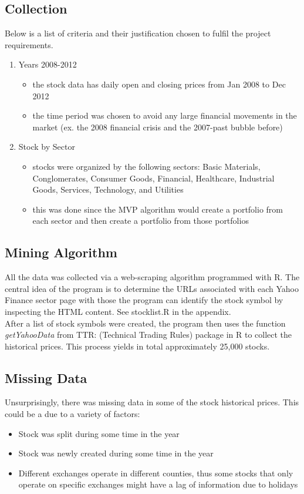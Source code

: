 \documentclass[12pt]{article}
\begin{document}
\subsection{Collection}
Below is a list of criteria and their justification chosen to fulfil the project requirements. 
\begin{enumerate}
\item Years 2008-2012
\begin{itemize}
\item the stock data has daily open and closing prices from Jan 2008 to Dec 2012
\item the time period was chosen to avoid any large financial movements in the market (ex. the 2008 financial crisis and the 2007-past bubble before)
\end{itemize}
\item Stock by Sector
\begin{itemize}
\item stocks were organized by the following sectors: Basic Materials, Conglomerates, Consumer Goods, Financial, Healthcare, Industrial Goods, Services, Technology, and Utilities
\item this was done since the MVP algorithm would create a portfolio from each sector and then create a portfolio from those portfolios
\end{itemize}
\end{enumerate}

\subsection{Mining Algorithm}
All the data was collected via a web-scraping algorithm programmed with R. The central idea of the program is to determine the URLs associated with each Yahoo Finance sector page with those the program can identify the stock symbol by inspecting the HTML content. See stocklist.R in the appendix.\\

After a list of stock symbols were created, the program then uses the function \textit{getYahooData} from TTR: (Technical Trading Rules) package in R to collect the historical prices. This process yields in total approximately 25,000 stocks. 
\subsection{Missing Data}
Unsurprisingly, there was missing data in some of the stock historical prices. This could be a due to a variety of factors: 
\begin{itemize}
\item Stock was split during some time in the year
\item Stock was newly created during some time in the year
\item Different exchanges operate in different counties, thus some stocks that only operate on specific exchanges might have a lag of information due to holidays
\end{itemize}
\end{document}
